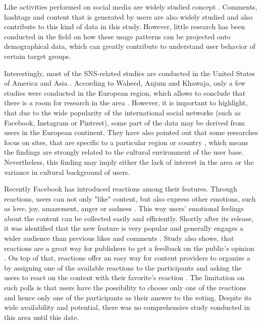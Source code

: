 Like activities performed on social media are widely studied concept \cite{bakhshi2014faces, jang2015noreciprocity, jang2016teensengagemorewithfewerphotos, ottoni2013ladies}. Comments, hashtags and content that is generated by users are also widely studied \cite{bakhshi2014faces, jang2016teensengagemorewithfewerphotos, hu2014we, bakhshi2014faces} and also contribute to this kind of data in this study. However, little research has been conducted in the field on how these usage patterns can be projected onto demographical data, which can greatly contribute to understand user behavior of certain target groups. 

Interestingly, most of the SNS-related studies are conducted in the United States of America and Asia \cite{waheed2017investigation}. According to Waheed, Anjum and Khawaja, only a few studies were conducted in the European region, which allows to conclude that there is a room for research in the area \cite{waheed2017investigation}. However, it is important to highlight, that due to the wide popularity of the international social networks (such as Facebook, Instagram or Pintrest), some part of the data may be derived from users in the European continent. They have also pointed out that some researches focus on sites, that are specific to a particular region or country \cite{waheed2017investigation}, which means the findings are strongly related to the cultural environment of the user base. Nevertheless, this finding may imply either the lack of interest in the area or the variance in cultural background of users. 

Recently Facebook has introduced reactions among their features. Through reactions, users can not only "like" content, but also express other emotions, such as love, joy, amazement, anger or sadness \cite{shouldfacebookusereactions, howarenewspublishersreactingonfacebook}. This way users' emotional feelings about the content can be collected easily and efficiently. Shortly after its release, it was identified that the new feature is very popular and generally engages a wider audience than previous likes and comments \cite{shouldfacebookusereactions}. Study also shows, that reactions are a great way for publishers to get a feedback on the public's opinion \cite{howarenewspublishersreactingonfacebook}. On top of that, reactions offer an easy way for content providers to organize a by assigning one of the available reactions to the participants and asking the users to react on the content with their favorite's reaction \cite{shouldfacebookusereactions}. The limitation on such polls is that users have the possibility to choose only one of the reactions and hence only one of the participants as their answer to the voting. Despite its wide availability and potential, there was no comprehensive study conducted in this area until this date.

